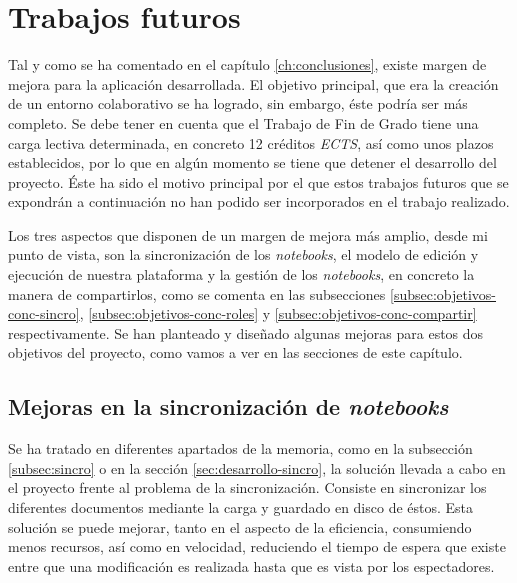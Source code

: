 \documentclass[11pt,spanish,listoffigures]{tfgetsinf}
\begin{document}



\chapter{Trabajos futuros}
\label{ch:futuro}


Tal y como se ha comentado en el capítulo \ref{ch:conclusiones}, existe  margen de mejora para la aplicación desarrollada. El objetivo principal, que era la creación de un entorno colaborativo se ha logrado, sin embargo, éste podría ser más completo. Se debe tener en cuenta que el Trabajo de Fin de Grado tiene una carga lectiva determinada, en concreto 12 créditos \textit{ECTS}, así como unos plazos establecidos, por lo que en algún momento se tiene que detener el desarrollo del proyecto. Éste ha sido el motivo principal por el que estos trabajos futuros que se expondrán a continuación no han podido ser incorporados en el trabajo realizado.

Los tres aspectos que disponen de un margen de mejora más amplio, desde mi punto de vista, son la sincronización de los \textit{notebooks}, el modelo de edición y ejecución de nuestra plataforma y la gestión de los \textit{notebooks}, en concreto la manera de compartirlos, como se comenta en las subsecciones \ref{subsec:objetivos-conc-sincro}, \ref{subsec:objetivos-conc-roles} y  \ref{subsec:objetivos-conc-compartir} respectivamente. Se han planteado y diseñado algunas mejoras para estos dos objetivos del proyecto, como vamos a ver en las secciones de este capítulo.



\section{Mejoras en la sincronización de \textit{notebooks}}
\label{sec:mejoras-sincro}

Se ha tratado en diferentes apartados de la memoria, como en la subsección \ref{subsec:sincro} o en la sección \ref{sec:desarrollo-sincro}, la solución llevada a cabo en el proyecto frente al problema de la sincronización. Consiste en sincronizar los diferentes documentos mediante la carga y guardado en disco de éstos. 
Esta solución se puede mejorar, tanto en el aspecto de la eficiencia, consumiendo menos recursos, así como en velocidad, reduciendo el tiempo de espera que existe entre que una modificación es realizada hasta que es vista por los espectadores.
\end{document}
